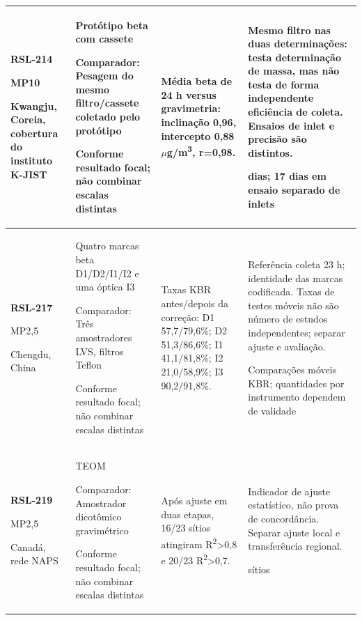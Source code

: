\begin{longtable}{|P{0.18\textwidth}|P{0.25\textwidth}|P{0.28\textwidth}|P{\arrayrulewidth\relax}|}
\textbf{RSL-214}\par\textcite{rsl214}\par MP10\par Kwangju, Coreia, cobertura do instituto K-JIST & Protótipo beta com cassete\par\medskip Comparador: Pesagem do mesmo filtro/cassete coletado pelo protótipo\par\medskip Conforme resultado focal; não combinar escalas distintas & Média beta de 24 h versus gravimetria: inclinação 0,96, intercepto 0,88 \ensuremath{\mu}g/m\textsuperscript{3}, r=0,98. & Mesmo filtro nas duas determinações: testa determinação de massa, mas não testa de forma independente eficiência de coleta. Ensaios de inlet e precisão são distintos.\par{} dias; 17 dias em ensaio separado de inlets\\\hline
\textbf{RSL-217}\par\textcite{rsl217}\par MP2,5\par Chengdu, China & Quatro marcas beta D1/D2/I1/I2 e uma óptica I3\par\medskip Comparador: Três amostradores LVS, filtros Teflon\par\medskip Conforme resultado focal; não combinar escalas distintas & Taxas KBR antes/depois da correção: D1 57,7/79,6\%; D2 51,3/86,6\%; I1 41,1/81,8\%; I2 21,0/58,9\%; I3 90,2/91,8\%. & Referência coleta 23 h; identidade das marcas codificada. Taxas de testes móveis não são número de estudos independentes; separar ajuste e avaliação.\par\medskip Comparações móveis KBR; quantidades por instrumento dependem de validade\\\hline
\textbf{RSL-219}\par\textcite{rsl219}\par MP2,5\par Canadá, rede NAPS & TEOM\par\medskip Comparador: Amostrador dicotômico gravimétrico\par\medskip Conforme resultado focal; não combinar escalas distintas & Após ajuste em duas etapas, 16/23 sítios atingiram R\textsuperscript{2}>0,8 e 20/23 R\textsuperscript{2}>0,7. & Indicador de ajuste estatístico, não prova de concordância. Separar ajuste local e transferência regional.\par{} sítios\\\hline

\end{longtable}
